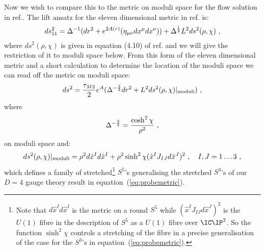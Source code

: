 \documentclass[a4paper,12pt]{article}
\newcommand{\labell}[1]{\label{#1}}
\newcommand{\reef}[1]{(\ref{#1})}
\begin{document}
Now we wish to compare this to the metric on moduli space for the flow
solution in ref.\cite{newwarner}. The lift ansatz for the eleven
dimensional metric in ref.\cite{newwarner} is:
\begin{equation}
ds^2_{11} = \Delta^{-1} (dr^2 + e^{2A(r)} ( \eta_{\mu \nu} dx^\mu dx^\nu)) 
+ \Delta^{{1 \over 2}} L^2 ds^2(\rho, \chi) \ ,
\labell{11dmetric}
\end{equation}
where $ds^2(\rho , \chi)$ is given in equation (4.10) of
ref.\cite{newwarner} and we will give the restriction of it to moduli
space below. From this form of the eleven dimensional metric and a
short calculation to determine the location of the moduli space we can
read off the metric on moduli space:
\begin{equation}
ds^2 = {\tau_{M2} \over 2} e^A (\Delta^{-{3 \over 2}} dr^2 
+ L^2 ds^2(\rho , \chi)\arrowvert_{\rm moduli})\ ,
\labell{moduli}
\end{equation}
where 
\begin{equation}
 \Delta^{-{3 \over 2}} = {\cosh^2 \chi \over \rho^2}  \ ,
\end{equation}
on moduli space and:
\begin{equation}
 ds^2(\rho , \chi)\arrowvert_{\rm moduli} = \rho^2 d\hat{x}^I d\hat{x}^I 
+ \rho^2 \sinh^2 \chi (\hat{x}^I J_{IJ} d\hat{x}^J)^2\ , \quad I,J=1\ldots 3\ ,
\labell{moduli2}
\end{equation}
which defines a family of stretched\footnote{Note that $d\hat{x}^I
  d\hat{x}^I$ is the metric on a round $S^5$ while $(\hat{x}^I J_{IJ}
  d\hat{x}^J)^2$ is the $U(1)$ fibre in the description of $S^5$ as a
  $U(1)$ fibre over $\IC\IP^2$. So the function $ \sinh^2 \chi$
  controls a stretching of the fibre in a precise generalisation of
  the case for the $S^3$'s in equation~\reef{eq:probemetric}.} $S^5$'s
generalising the stretched $S^3$'s of our $D=4$ gauge theory result in
equation~\reef{eq:probemetric}.
\end{document}
